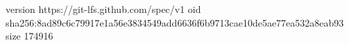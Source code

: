 version https://git-lfs.github.com/spec/v1
oid sha256:8ad89c6c79917e1a56e3834549add6636f6b9713cae10de5ae77ea532a8eab93
size 174916
